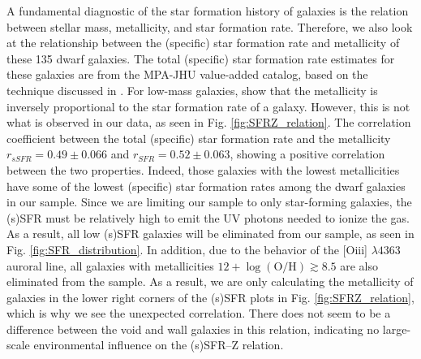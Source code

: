 A fundamental diagnostic of the star formation history of galaxies is the 
relation between stellar mass, metallicity, and star formation rate.  Therefore, 
we also look at the relationship between the (specific) star formation rate and 
metallicity of these 135 dwarf galaxies.  The total (specific) star formation 
rate estimates for these galaxies are from the MPA-JHU value-added catalog, 
based on the technique discussed in \cite{Brinchmann04}.  For low-mass galaxies, 
\cite{Henry13} show that the metallicity is inversely proportional to the star 
formation rate of a galaxy.  However, this is not what is observed in our data, 
as seen in Fig. \ref{fig:SFRZ_relation}.  The correlation coefficient between 
the total (specific) star formation rate and the metallicity 
$r_{sSFR} = 0.49 \pm 0.066$ and $r_{SFR} = 0.52 \pm 0.063$, showing a positive 
correlation between the two properties.  Indeed, those galaxies with the lowest 
metallicities have some of the lowest (specific) star formation rates among the 
dwarf galaxies in our sample.  Since we are limiting our sample to only 
star-forming galaxies, the (s)SFR must be relatively high to emit the UV photons 
needed to ionize the gas.  As a result, all low (s)SFR galaxies will be 
eliminated from our sample, as seen in Fig. \ref{fig:SFR_distribution}.  In 
addition, due to the behavior of the [O{\sc iii}] $\lambda 4363$ auroral line, 
all galaxies with metallicities $12 + \log (\text{O}/\text{H}) \gtrsim 8.5$ are 
also eliminated from the sample.  As a result, we are only calculating the 
metallicity of galaxies in the lower right corners of the (s)SFR plots in Fig. 
\ref{fig:SFRZ_relation}, which is why we see the unexpected correlation.  There 
does not seem to be a difference between the void and wall galaxies in this 
relation, indicating no large-scale environmental influence on the (s)SFR--Z 
relation.

